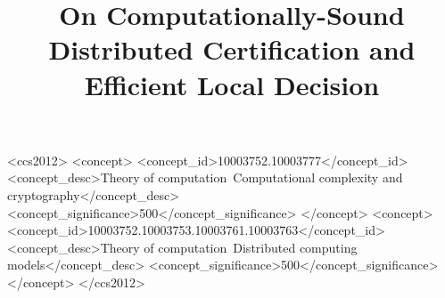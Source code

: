 \documentclass[acmsmall,nonacm,anonymous]{acmart}
\begin{document}
\title{On Computationally-Sound Distributed Certification and Efficient Local Decision}





\begin{CCSXML}
<ccs2012>
   <concept>
       <concept_id>10003752.10003777</concept_id>
       <concept_desc>Theory of computation~Computational complexity and cryptography</concept_desc>
       <concept_significance>500</concept_significance>
       </concept>
   <concept>
       <concept_id>10003752.10003753.10003761.10003763</concept_id>
       <concept_desc>Theory of computation~Distributed computing models</concept_desc>
       <concept_significance>500</concept_significance>
       </concept>
 </ccs2012>
\end{CCSXML}




\maketitle














%


\appendix
\appendixpage





\end{document}
